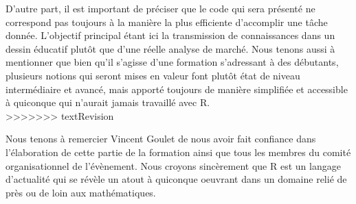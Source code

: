 \noindent
D'autre part, il est important de préciser que le code qui sera présenté ne correspond pas toujours à la manière la plus efficiente d'accomplir une tâche donnée. L'objectif principal étant ici la transmission de connaissances dans un dessin éducatif plutôt que d'une réelle analyse de marché. Nous tenons aussi à mentionner que bien qu'il s'agisse d'une formation s'adressant à des débutants, plusieurs notions qui seront mises en valeur font plutôt état de niveau intermédiaire et avancé, mais apporté toujours de manière simplifiée et accessible à quiconque qui n'aurait jamais travaillé avec R. \\
>>>>>>> textRevision

Nous tenons à remercier Vincent Goulet de nous avoir fait confiance dans l'élaboration de cette partie de la formation ainsi que tous les membres du comité organisationnel de l'évènement. Nous croyons sincèrement que R est un langage d'actualité qui se révèle un atout à quiconque oeuvrant dans un domaine relié de près ou de loin aux mathématiques.